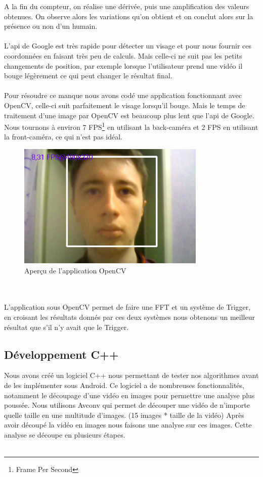 A la fin du compteur, on réalise une dérivée, puis une amplification des valeurs obtenues. On observe alors les variations qu'on obtient et on conclut alors sur la présence ou non d'un humain.\\
\\
L'api de Google est très rapide pour détecter un visage et pour nous fournir ces coordonnées en faisant très peu de calculs. Mais celle-ci ne suit pas les petits changements de position, par exemple lorsque l'utilisateur prend une vidéo il bouge légèrement ce qui peut changer le résultat final.\\
\\
Pour résoudre ce manque nous avons codé une application fonctionnant avec OpenCV, celle-ci suit parfaitement le visage lorsqu'il bouge. Mais le temps de traitement d'une image par OpenCV est beaucoup plus lent que l'api de Google. Nous tournons à environ 7 FPS\footnote{Frame Per Second} en utilisant la back-caméra et 2 FPS en utilisant la front-caméra, ce qui n'est pas idéal.
\begin{figure}[h!]
	\centering
	\includegraphics[width=0.8\textwidth]{data/opencv.png}
	\caption{Aperçu de l'application OpenCV}
\end{figure}
\\
\\
L'application sous OpenCV permet de faire une FFT et un système de Trigger, en croisant les résultats donnés par ces deux systèmes nous obtenons un meilleur résultat que s'il n'y avait que le Trigger.

\subsection{Développement C++}

Nous avons créé un logiciel C++ nous permettant de tester nos algorithmes avant de les implémenter sous Android.
Ce logiciel a de nombreuses fonctionnalités, notamment le découpage d'une vidéo en images pour permettre une analyse plus poussée.
Nous utilisons Avconv qui permet de découper une vidéo de n'importe quelle taille en une multitude d'images. (15 images * taille de la vidéo)
Après avoir découpé la vidéo en images nous faisons une analyse sur ces images.
Cette analyse se découpe en plusieurs étapes.\\\\

